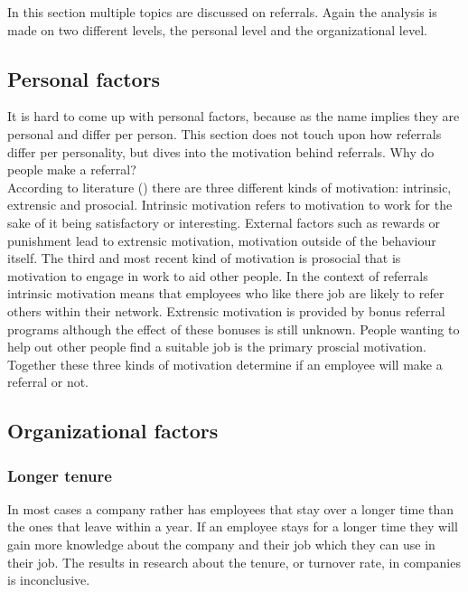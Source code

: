 \documentclass[Main.tex]{subfiles}
\begin{document}
In this section multiple topics are discussed on referrals. Again the analysis is made on two different levels, the personal level and the organizational level. 

\subsection*{Personal factors}

It is hard to come up with personal factors, because as the name implies they are personal and differ per person. This section does not touch upon how referrals differ per personality, but dives into the motivation behind referrals. Why do people make a referral? \\

According to literature (\cite{motives}) there are three different kinds of motivation: intrinsic, extrensic and prosocial. Intrinsic motivation refers to motivation to work for the sake of it being satisfactory or interesting. External factors such as rewards or punishment lead to extrensic motivation, motivation outside of the behaviour itself. The third and most recent kind of motivation is prosocial that is motivation to engage in work to aid other people. In the context of referrals intrinsic motivation means that employees who like there job are likely to refer others within their network. Extrensic motivation is provided by bonus referral programs although the effect of these bonuses is still unknown. People wanting to help out other people find a suitable job is the primary proscial motivation. Together these three kinds of motivation determine if an employee will make a referral or not.


\subsection*{Organizational factors}

\subsubsection*{Longer tenure}
In most cases a company rather has employees that stay over a longer time than the ones that leave within a year. If an employee stays for a longer time they will gain more knowledge about the company and their job which they can use in their job. 
The results in research about the tenure, or turnover rate, in companies is inconclusive.
\end{document}
